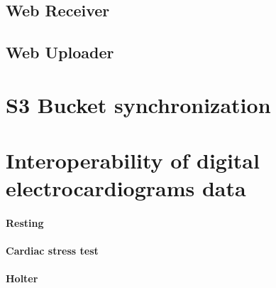 \subsection{Web Receiver}
\label{subsection:webreceiver}
\subsection{Web Uploader}
\section{S3 Bucket synchronization}
\section{Interoperability of digital electrocardiograms data}
\paragraph{Resting}
\paragraph{Cardiac stress test}
\paragraph{Holter}




